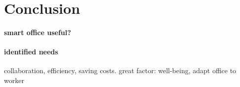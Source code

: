 \section{Conclusion}
\paragraph{smart office useful?}
\paragraph{identified needs}
collaboration, efficiency, saving costs. great factor: well-being, adapt office to worker
